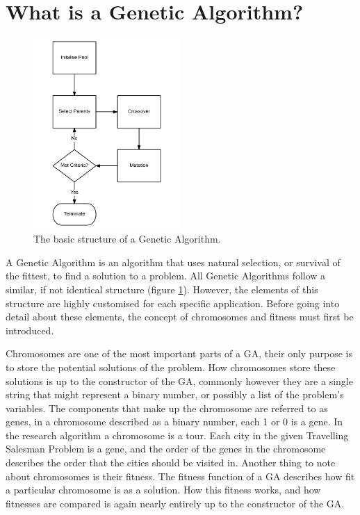 \section{What is a Genetic Algorithm?}
\begin{figure}[h]
	\centering
		\includegraphics[width=0.5\textwidth]{GA_Structure}
	\caption{The basic structure of a Genetic Algorithm.}
	\label{struct}
\end{figure}
\noindent
A Genetic Algorithm is an algorithm that uses natural selection, or survival of the fittest, to find a solution to a problem. All Genetic Algorithms follow a similar, if not identical structure (figure \ref{struct}). However, the elements of this structure are highly customised for each specific application. Before going into detail about these elements, the concept of chromosomes and fitness must first be introduced.
\par
Chromosomes are one of the most important parts of a GA, their only purpose is to store the potential solutions of the problem. How chromosomes store these solutions is up to the constructor of the GA, commonly however they are a single string that might represent a binary number, or possibly a list of the problem's variables. The components that make up the chromosome are referred to as genes, in a chromosome described as a binary number, each 1 or 0 is a gene. In the research algorithm a chromosome is a tour. Each city in the given Travelling Salesman Problem is a gene, and the order of the genes in the chromosome describes the order that the cities should be visited in. Another thing to note about chromosomes is their fitness. The fitness function of a GA describes how fit a particular chromosome is as a solution. How this fitness works, and how fitnesses are compared is again nearly entirely up to the constructor of the GA.


